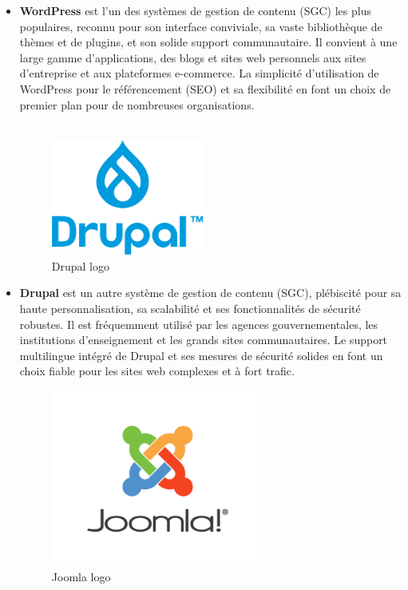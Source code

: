 \begin{itemize}

    \item \textbf{WordPress} est l'un des systèmes de gestion de contenu (SGC) les plus populaires, reconnu pour son interface conviviale, sa vaste bibliothèque de thèmes et de plugins, et son solide support communautaire. Il convient à une large gamme d'applications, des blogs et sites web personnels aux sites d'entreprise et aux plateformes e-commerce.  La simplicité d'utilisation de WordPress pour le référencement (SEO) et sa flexibilité en font un choix de premier plan pour de nombreuses organisations.
          \\
          \\
          \begin{figure}[H]
              \centering
              \includegraphics[width=5cm]{Figures/Drupal.png}
              \caption{Drupal logo}
              \label{fig:my_label} %
          \end{figure}


    \item \textbf{Drupal} est un autre système de gestion de contenu (SGC), plébiscité pour sa haute personnalisation, sa scalabilité et ses fonctionnalités de sécurité robustes. Il est fréquemment utilisé par les agences gouvernementales, les institutions d'enseignement et les grands sites communautaires. Le support multilingue intégré de Drupal et ses mesures de sécurité solides en font un choix fiable pour les sites web complexes et à fort trafic.

          \begin{figure}[H]
              \centering
              \includegraphics[width=7cm]{Figures/Joomla.png}
              \caption{Joomla logo}
              \label{fig:my_label} %
          \end{figure}



\end{itemize}
